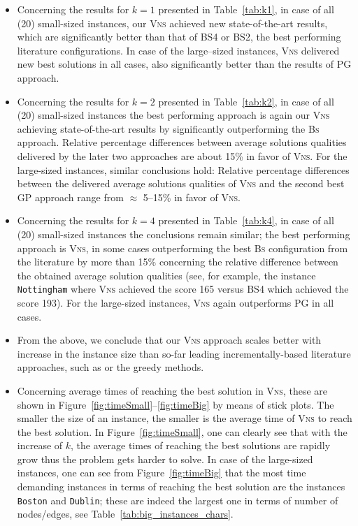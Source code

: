 \documentclass[dvipsnames,format=sigconf,anonymous=true,review=true]{acmart}
\begin{document}
   \begin{itemize}
   		\item  Concerning the results for $k=1$ presented in Table~\ref{tab:k1}, in case of all (20) small-sized instances, our \textsc{Vns} achieved new state-of-the-art results, which are   significantly better than that of BS4 or BS2, the best performing literature configurations. In case of the large--sized instances,   \textsc{Vns} delivered new best solutions in all cases, also significantly better than the results of \textsc{PG} approach.  
   		\item Concerning the results for $k=2$ presented in Table~\ref{tab:k2}, in case of all (20) small-sized instances the best performing approach is again our \textsc{Vns} achieving   state-of-the-art results by significantly outperforming the \textsc{Bs} approach. Relative percentage differences between average solutions qualities delivered by the later two   approaches are about 15\% in favor of   \textsc{Vns}. For the large-sized instances, similar conclusions hold: Relative percentage differences between the  delivered average solutions qualities of \textsc{Vns} and the second best \textsc{GP} approach range from  $\approx$ 5--15\% in favor of   \textsc{Vns}. 
   		\item Concerning the results for $k=4$ presented in Table~\ref{tab:k4}, in case of all (20) small-sized instances the conclusions remain similar; the best performing approach is \textsc{Vns}, in some cases outperforming the best \textsc{Bs} configuration from the  literature by more than 15\% concerning the relative difference  between the obtained average solution qualities (see, for example,  the instance \texttt{Nottingham} where \textsc{Vns} achieved the score 165 versus BS4 which achieved the score 193). For the large-sized instances, \textsc{Vns} again outperforms \textsc{PG} in all cases. 
   		\item From the above, we conclude that our \textsc{Vns} approach scales better with increase in the instance size than so-far leading incrementally-based literature approaches, such as  or the greedy methods. 
   		\item Concerning average times of reaching the best solution in \textsc{Vns}, these are shown in Figure~\ref{fig:timeSmall}--\ref{fig:timeBig} by means of stick plots. %
   		The smaller the size of an instance, the smaller is the average time of \textsc{Vns}  to reach the best solution.  In Figure~\ref{fig:timeSmall}, one can clearly see that with the increase of $k$, the average times of reaching the best solutions are rapidly grow thus the problem gets harder to solve. In case of the large-sized instances, one can see  from  Figure~\ref{fig:timeBig} that the most time demanding instances in terms of reaching the best solution are the instances \texttt{Boston} and \texttt{Dublin}; these are indeed the largest one in terms of number of nodes/edges, see Table~\ref{tab:big_instances_chars}.  

\end{itemize}
\end{document}
